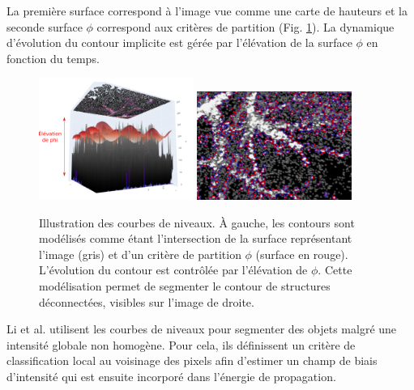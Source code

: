        La première surface correspond à l'image vue comme une carte de hauteurs et la seconde surface $\phi$ correspond aux critères de partition (Fig. \ref{fig:level_set}). La dynamique d'évolution du contour implicite est gérée par l'élévation de la surface $\phi$ en fonction du temps. 

      \begin{figure}[h]
        \centering
        \includegraphics[width=0.45\textwidth]{Images/levelSet_1.png}
        \includegraphics[width=0.45\textwidth]{Images/levelSet_2.png}
        \caption{Illustration des courbes de niveaux. À gauche, les contours sont modélisés comme étant l'intersection de la surface représentant l'image (gris) et d'un critère de partition $\phi$ (surface en rouge). L'évolution du contour est contrôlée par l'élévation de $\phi$. Cette modélisation permet de segmenter le contour de structures déconnectées, visibles sur l'image de droite.}
        \label{fig:level_set}
      \end{figure}

      Li et al. \cite{Li2011_mri_level_set} utilisent les courbes de niveaux pour segmenter des objets malgré une intensité globale non homogène. Pour cela, ils définissent un critère de classification local au voisinage des pixels afin d'estimer un champ de biais d'intensité qui est ensuite incorporé dans l'énergie de propagation.


